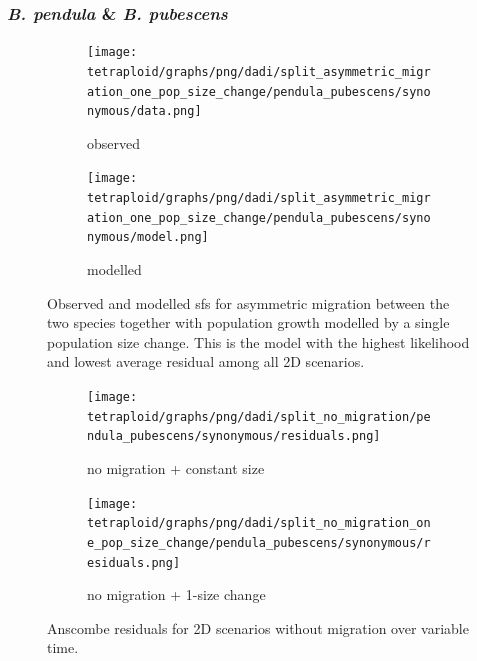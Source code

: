 \documentclass[hidelinks,11pt]{article}
\newcommand{\pendula}{\textit{B. pendula}}
\newcommand{\pubescens}{\textit{B. pubescens}}
\begin{document}
    \subsubsection{\pendula{} \& \pubescens{}}
    
    \begin{figure}[H]
        \centering
        \begin{subfigure}[b]{0.49\textwidth}
            \texttt{[image: tetraploid/graphs/png/dadi/split\_asymmetric\_migration\_one\_pop\_size\_change/pendula\_pubescens/synonymous/data.png]}
            \caption{observed}
            \label{fig:constant_pop_size_since_ice_age}
        \end{subfigure}
        \hfill
        \begin{subfigure}[b]{0.49\textwidth}
            \texttt{[image: tetraploid/graphs/png/dadi/split\_asymmetric\_migration\_one\_pop\_size\_change/pendula\_pubescens/synonymous/model.png]}
            \caption{modelled}
            \label{fig:one_pop_size_change_since_ice_age}
        \end{subfigure}
        \caption{Observed and modelled \acrshort{sfs} for asymmetric migration between the two species together with population growth modelled by a single population size change. This is the model with the highest likelihood and lowest average residual among all 2D scenarios.}
        \label{fig:dadi_sfs_best_fixed_time_model}
    \end{figure}

    \begin{figure}[H]
        \centering
        \begin{subfigure}[b]{0.49\textwidth}
            \texttt{[image: tetraploid/graphs/png/dadi/split\_no\_migration/pendula\_pubescens/synonymous/residuals.png]}
            \caption{no migration + constant size}
        \end{subfigure}
        \hfill
        \begin{subfigure}[b]{0.495\textwidth}
            \texttt{[image: tetraploid/graphs/png/dadi/split\_no\_migration\_one\_pop\_size\_change/pendula\_pubescens/synonymous/residuals.png]}
            \caption{no migration + 1-size change}
        \end{subfigure}
        \caption{Anscombe residuals for 2D scenarios without migration over variable time.}
        \label{fig:dadi_2d_residuals_constant_size_variable_time}
    \end{figure}
\end{document}
